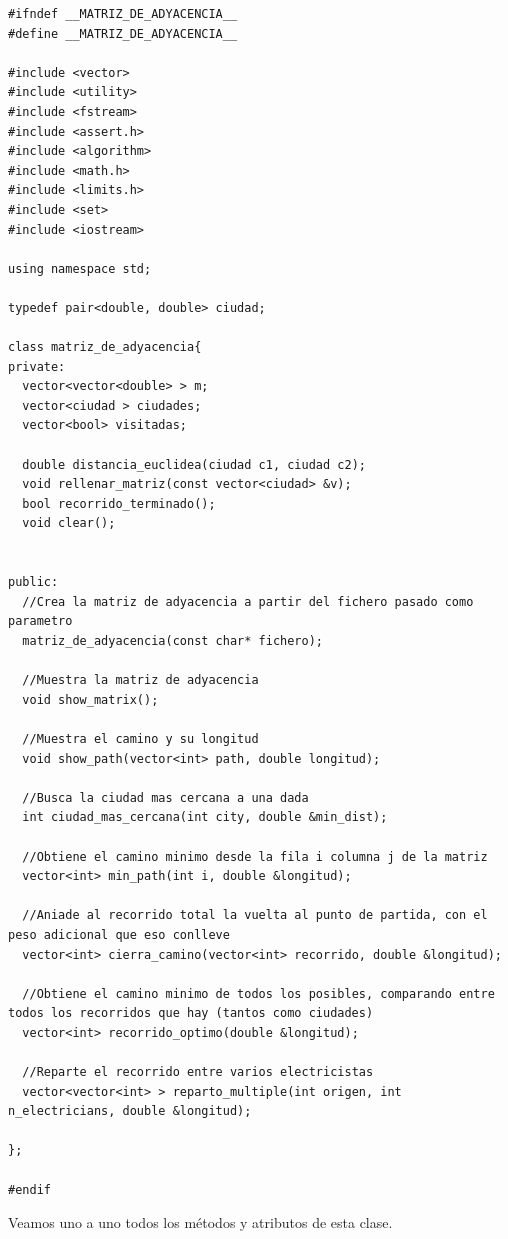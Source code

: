 \documentclass[12pt]{article}
\begin{document}
\begin{lstlisting}
#ifndef __MATRIZ_DE_ADYACENCIA__
#define __MATRIZ_DE_ADYACENCIA__

#include <vector>
#include <utility>
#include <fstream> 
#include <assert.h>
#include <algorithm>
#include <math.h>
#include <limits.h>
#include <set>
#include <iostream>

using namespace std;

typedef pair<double, double> ciudad;

class matriz_de_adyacencia{
private:
  vector<vector<double> > m;
  vector<ciudad > ciudades;
  vector<bool> visitadas;

  double distancia_euclidea(ciudad c1, ciudad c2);
  void rellenar_matriz(const vector<ciudad> &v);
  bool recorrido_terminado();
  void clear();


public:
  //Crea la matriz de adyacencia a partir del fichero pasado como parametro
  matriz_de_adyacencia(const char* fichero);

  //Muestra la matriz de adyacencia
  void show_matrix();

  //Muestra el camino y su longitud
  void show_path(vector<int> path, double longitud);

  //Busca la ciudad mas cercana a una dada
  int ciudad_mas_cercana(int city, double &min_dist);

  //Obtiene el camino minimo desde la fila i columna j de la matriz
  vector<int> min_path(int i, double &longitud);

  //Aniade al recorrido total la vuelta al punto de partida, con el peso adicional que eso conlleve
  vector<int> cierra_camino(vector<int> recorrido, double &longitud);

  //Obtiene el camino minimo de todos los posibles, comparando entre todos los recorridos que hay (tantos como ciudades)
  vector<int> recorrido_optimo(double &longitud);

  //Reparte el recorrido entre varios electricistas
  vector<vector<int> > reparto_multiple(int origen, int n_electricians, double &longitud);

};

#endif

\end{lstlisting} 
Veamos uno a uno todos los métodos y atributos de esta clase.
\end{document}
